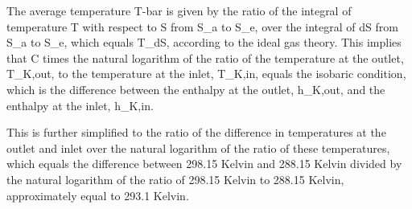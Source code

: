 The average temperature T-bar is given by the ratio of the integral of temperature T with respect to S from S_a to S_e, over the integral of dS from S_a to S_e, which equals T_dS, according to the ideal gas theory. This implies that C times the natural logarithm of the ratio of the temperature at the outlet, T_K,out, to the temperature at the inlet, T_K,in, equals the isobaric condition, which is the difference between the enthalpy at the outlet, h_K,out, and the enthalpy at the inlet, h_K,in.

This is further simplified to the ratio of the difference in temperatures at the outlet and inlet over the natural logarithm of the ratio of these temperatures, which equals the difference between 298.15 Kelvin and 288.15 Kelvin divided by the natural logarithm of the ratio of 298.15 Kelvin to 288.15 Kelvin, approximately equal to 293.1 Kelvin.
